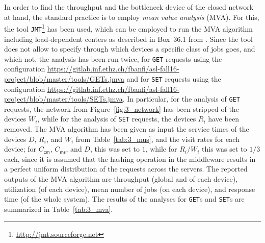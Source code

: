 \documentclass[11pt]{article}
\theoremstyle{definition}
\renewcommand\t\texttt
\begin{document}
In order to find the throughput and the bottleneck device of the closed network at hand, the standard practice is to employ \emph{mean value analysis} (MVA).
For this, the tool \t{JMT}\footnote{\url{http://jmt.sourceforge.net}} has been used, which can be employed to run the MVA algorithm including load-dependent centers as described in Box~36.1 from \cite{jain91}.
Since the tool does not allow to specify through which devices a specific class of jobs goes, and which not, the analysis has been run twice, for \t{GET} requests using the configuration \url{https://gitlab.inf.ethz.ch/fbanfi/asl-fall16-project/blob/master/tools/GETs.jmva} and for \t{SET} requests using the configuration \url{https://gitlab.inf.ethz.ch/fbanfi/asl-fall16-project/blob/master/tools/SETs.jmva}.
In particular, for the analysis of \t{GET} requests, the network from Figure~\ref{fig:3_network} has been stripped of the devices $W_i$, while for the analysis of \t{SET} requests, the devices $R_i$ have been removed.
The MVA algorithm has been given as input the service times of the devices $D$, $R_i$, and $W_i$ from Table~\ref{tab:3_mus}, and the visit rates for each device;
for $C_{\textsf{cm}}$, $C_{\textsf{ms}}$, and $D$, this was set to $1$, while for $R_i/W_i$ this was set to $1/3$ each, since it is assumed that the hashing operation in the middleware results in a perfect uniform distribution of the requests across the servers.
The reported outputs of the MVA algorithm are throughput (global and of each device), utilization (of each device), mean number of jobs (on each device), and response time (of the whole system).
The results of the analyses for \t{GET}s and \t{SET}s are summarized in Table~\ref{tab:3_mva}.
\end{document}
